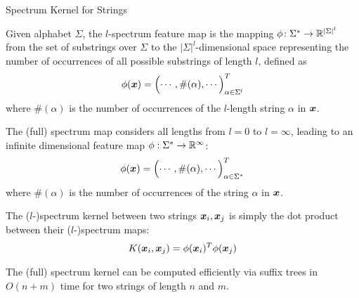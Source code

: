 \ifdefined\wox \begin{frame} \titlepage \end{frame} \fi

\begin{frame}{Spectrum Kernel for Strings}

\small
Given alphabet $\Sigma$,  the $l$-spectrum feature map is
the mapping $\phi\!: \Sigma^* \to {\mathord{\mathbb R}}^{|\Sigma|^l}$ from the set of
substrings over $\Sigma$ to the $|\Sigma|^l$-dimensional space
representing the number of occurrences of all possible
substrings of length $l$, def\/{i}ned as
\begin{align*}
  \phi({\boldsymbol x}) = \Bigl( \cdots, \#(\alpha), \cdots \Bigr)^T_{\alpha \in \Sigma^l}
\end{align*}
where $\#(\alpha)$ is the number of occurrences of the $l$-length string
$\alpha$ in ${\boldsymbol x}$.

\medskip
The (full) spectrum map 
considers all lengths from $l=0$ to $l=\infty$, leading to an 
inf\/{i}nite
dimensional feature map $\phi: \Sigma^* \to {\mathord{\mathbb R}}^\infty$:
\begin{align*}
  \phi({\boldsymbol x}) = \Bigl( \cdots,
  \#(\alpha), \cdots \Bigr)^T_{\alpha \in \Sigma^*}
\end{align*}
where $\#(\alpha)$ is the number of occurrences of the string
$\alpha$ in ${\boldsymbol x}$.

\medskip
The ($l$-)spectrum kernel between two strings ${\boldsymbol x}_i, {\boldsymbol x}_{j}$
is simply the dot product between their ($l$-)spectrum maps:
\begin{align*}
  K({\boldsymbol x}_i, {\boldsymbol x}_{j}) = \phi({\boldsymbol x}_i)^T\phi({\boldsymbol x}_{j})
\end{align*}

\medskip
The (full) spectrum kernel can be computed
eff\/{i}ciently via suff\/{i}x trees 
in $O(n + m)$ time for two strings of length $n$ and $m$.
\end{frame}


